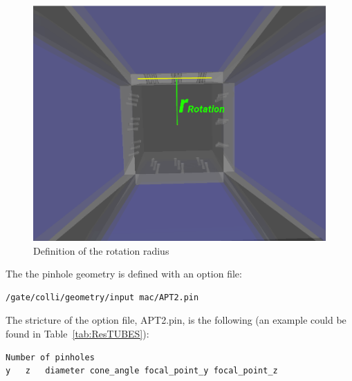 \documentclass[12pt]{article}
\begin{document}
\begin{figure}[htp]
\centering
\includegraphics[scale=0.3]{figs/rot_radius.png}
\caption{Definition of the rotation radius}
\label{fig:rot_radius}
\end{figure}


The the pinhole geometry is defined with an option file:
\begin{verbatim}
/gate/colli/geometry/input mac/APT2.pin
\end{verbatim}

The stricture of the option file, APT2.pin, is the following (an example could be found in Table~\ref{tab:ResTUBES}):
\begin{verbatim}
Number of pinholes
y	z	diameter cone_angle	focal_point_y focal_point_z
\end{verbatim}
\end{document}
